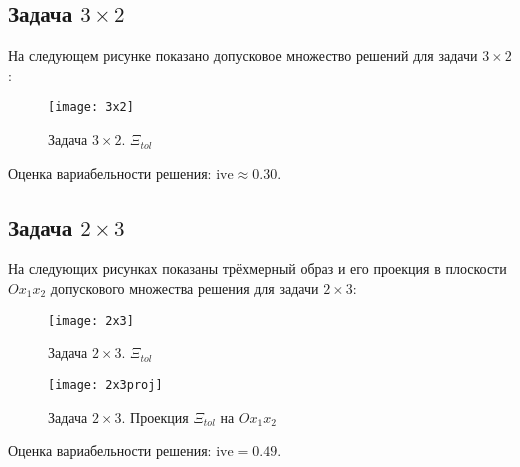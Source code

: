 \subsection{Задача $3 \times 2$}

На следующем рисунке показано допусковое множество решений для задачи $3 \times 2$:

\begin{figure}[H]
	\begin{center}
		\texttt{[image: 3x2]}
		\label{pic:32tol}
		\caption{Задача $3 \times 2$. $\Xi_{tol}$}
	\end{center}
\end{figure}

Оценка вариабельности решения: $\textrm{ive} \approx 0.30$.

\subsection{Задача $2 \times 3$}
На следующих рисунках показаны трёхмерный образ и его проекция в плоскости $Ox_1x_2$ допускового множества решения для задачи $2 \times 3$:

\begin{figure}[H]
	\begin{center}
		\texttt{[image: 2x3]}
		\label{pic:23tol}
		\caption{Задача $2 \times 3$. $\Xi_{tol}$}
	\end{center}
\end{figure}

\begin{figure}[H]
	\begin{center}
		\texttt{[image: 2x3proj]}
		\label{pic:23projtol}
		\caption{Задача $2 \times 3$. Проекция $\Xi_{tol}$ на $Ox_1x_2$}
	\end{center}
\end{figure}

Оценка вариабельности решения: $\textrm{ive} = 0.49$.